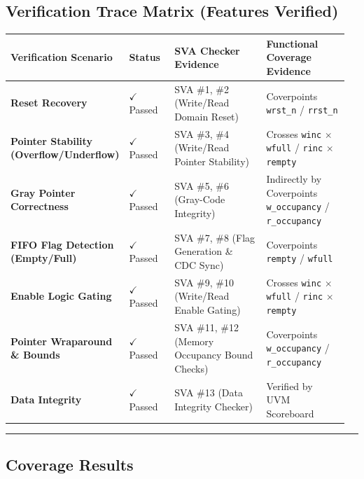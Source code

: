 \documentclass[
]{article}
\newcounter{none} %
\begin{document}
\subsection{Verification Trace Matrix (Features
Verified)}\label{verification-trace-matrix-features-verified}

{\def\LTcaptype{none} %
\begin{longtable}[]{@{}p{0.24\linewidth}p{0.14\linewidth}p{0.31\linewidth}p{0.27\linewidth}@{}}
\toprule\noalign{}
Verification Scenario & Status & SVA Checker Evidence & Functional
Coverage Evidence \\
\midrule\noalign{}
\endhead
\bottomrule\noalign{}
\endlastfoot
\textbf{Reset Recovery} & $\checkmark$ Passed & SVA \#1, \#2 (Write/Read Domain
Reset) & Coverpoints \texttt{wrst\_n} / \texttt{rrst\_n} \\
\textbf{Pointer Stability (Overflow/Underflow)} & $\checkmark$ Passed & SVA \#3,
\#4 (Write/Read Pointer Stability) & Crosses \texttt{winc} $\times$
\texttt{wfull} / \texttt{rinc} $\times$ \texttt{rempty} \\
\textbf{Gray Pointer Correctness} & $\checkmark$ Passed & SVA \#5, \#6 (Gray-Code
Integrity) & Indirectly by Coverpoints \texttt{w\_occupancy} /
\texttt{r\_occupancy} \\
\textbf{FIFO Flag Detection (Empty/Full)} & $\checkmark$ Passed & SVA \#7, \#8
(Flag Generation \& CDC Sync) & Coverpoints \texttt{rempty} /
\texttt{wfull} \\
\textbf{Enable Logic Gating} & $\checkmark$ Passed & SVA \#9, \#10 (Write/Read
Enable Gating) & Crosses \texttt{winc} $\times$ \texttt{wfull} / \texttt{rinc}
$\times$ \texttt{rempty} \\
\textbf{Pointer Wraparound \& Bounds} & $\checkmark$ Passed & SVA \#11, \#12
(Memory Occupancy Bound Checks) & Coverpoints \texttt{w\_occupancy} /
\texttt{r\_occupancy} \\
\textbf{Data Integrity} & $\checkmark$ Passed & SVA \#13 (Data Integrity Checker)
& Verified by UVM Scoreboard \\
\end{longtable}
}

\begin{center}\rule{0.5\linewidth}{0.5pt}\end{center}

\subsection{Coverage Results}\label{coverage-results}
\end{document}
